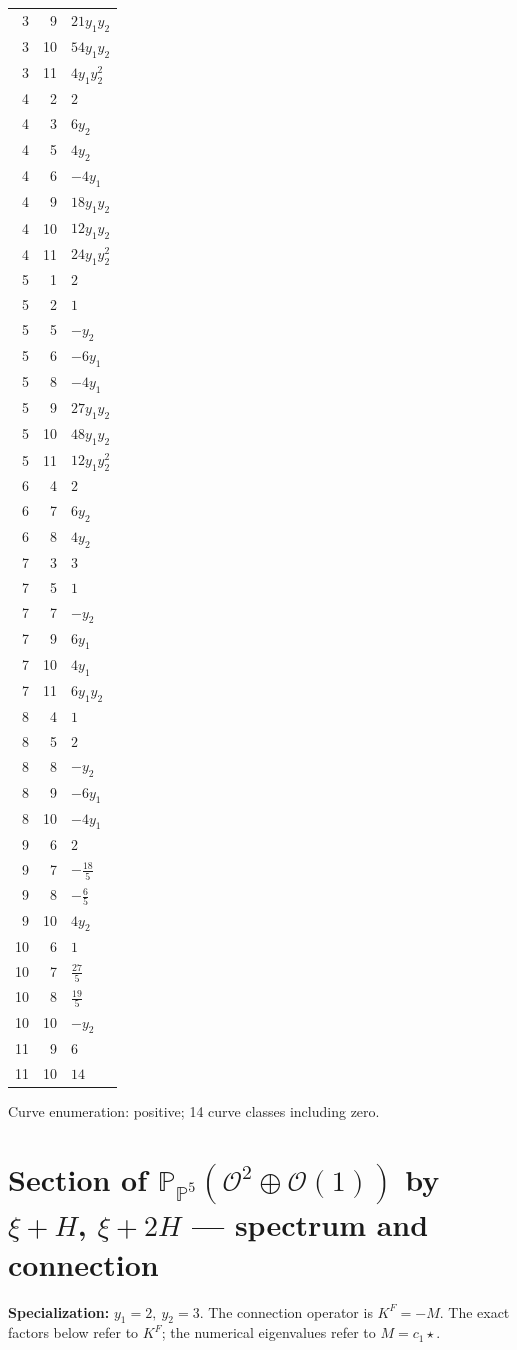 \documentclass[10pt,a4paper]{article}
\begin{document}
{\begin{longtable}{rrp{125mm}}
3 & 9 & $21 y_{1} y_{2}$\\
3 & 10 & $54 y_{1} y_{2}$\\
3 & 11 & $4 y_{1} y_{2}^{2}$\\
4 & 2 & $2$\\
4 & 3 & $6 y_{2}$\\
4 & 5 & $4 y_{2}$\\
4 & 6 & $- 4 y_{1}$\\
4 & 9 & $18 y_{1} y_{2}$\\
4 & 10 & $12 y_{1} y_{2}$\\
4 & 11 & $24 y_{1} y_{2}^{2}$\\
5 & 1 & $2$\\
5 & 2 & $1$\\
5 & 5 & $- y_{2}$\\
5 & 6 & $- 6 y_{1}$\\
5 & 8 & $- 4 y_{1}$\\
5 & 9 & $27 y_{1} y_{2}$\\
5 & 10 & $48 y_{1} y_{2}$\\
5 & 11 & $12 y_{1} y_{2}^{2}$\\
6 & 4 & $2$\\
6 & 7 & $6 y_{2}$\\
6 & 8 & $4 y_{2}$\\
7 & 3 & $3$\\
7 & 5 & $1$\\
7 & 7 & $- y_{2}$\\
7 & 9 & $6 y_{1}$\\
7 & 10 & $4 y_{1}$\\
7 & 11 & $6 y_{1} y_{2}$\\
8 & 4 & $1$\\
8 & 5 & $2$\\
8 & 8 & $- y_{2}$\\
8 & 9 & $- 6 y_{1}$\\
8 & 10 & $- 4 y_{1}$\\
9 & 6 & $2$\\
9 & 7 & $- \frac{18}{5}$\\
9 & 8 & $- \frac{6}{5}$\\
9 & 10 & $4 y_{2}$\\
10 & 6 & $1$\\
10 & 7 & $\frac{27}{5}$\\
10 & 8 & $\frac{19}{5}$\\
10 & 10 & $- y_{2}$\\
11 & 9 & $6$\\
11 & 10 & $14$\\
\end{longtable}}
Curve enumeration: positive; 14 curve classes including zero.
\clearpage\section*{Section of $\mathbb P_{\mathbb P^{5}}(\mathcal O^{2}\oplus \mathcal O(1))$ by $\xi +H$, $\xi +2H$ --- spectrum and connection}
\textbf{Specialization:} $y_1=2,\ y_2=3$. The connection operator is $K^F=-M$. The exact factors below refer to $K^F$; the numerical eigenvalues refer to $M=c_1\star$.
\end{document}
